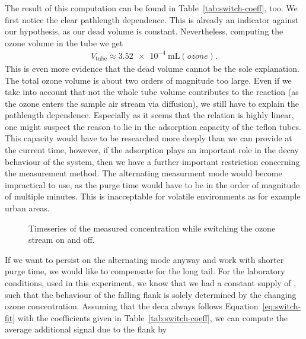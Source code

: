 The result of this computation can be found in
Table~\ref{tab:switch-coeff}, too. We first notice the clear
pathlength dependence. This is already an indicator against our
hypothesis, as our dead volume is constant. Nevertheless, computing
the ozone volume in the tube we get
\begin{align*}
  V_{\text{tube}} \approx \SI{3.52e-4}{\milli\liter(ozone)}.
\end{align*}
This is even more evidence that the dead volume cannot be the sole
explanation. The total ozone volume is about two orders of magnitude
too large. Even if we take into account that not the whole tube volume
contributes to the reaction (as the ozone enters the sample air stream
via diffusion), we still have to explain the pathlength
dependence. Especially as it seems that the relation is highly linear,
one might suspect the reason to lie in the adsorption capacity of the
teflon tubes. This capacity would have to be researched more deeply
than we can provide at the current time, however, if the adsorption
plays an important role in the decay behaviour of the system, then we
have a further important restriction concerning the measurement
method. The alternating measurment mode would become impractical to
use, as the purge time would have to be in the order of magnitude of
multiple minutes. This is inacceptable for volatile environments as
for example urban areas.

\begin{figure}[htbp]
  \centering
  
  \caption{Timeseries of the measured  concentration while
    switching the ozone stream on and off.}
  \label{fig:switch}
\end{figure}
If we want to persist on the alternating mode anyway and work with
shorter purge time, we would like to compensate for the long tail. For
the laboratory conditions, used in this experiment, we know that we
had a constant supply of , such that the behaviour of the
falling flank is solely determined by the changing ozone
concentration. Assuming that the deca always follows
Equation~\eqref{eq:switch-fit} with the coefficients given in
Table~\ref{tab:switch-coeff}, we can compute the average additional
 signal due to the flank by

